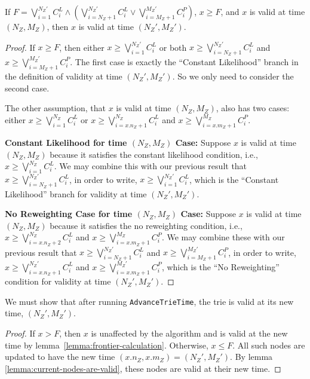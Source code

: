 \begin{lemma}
\label{lemma:frontier-calculation}
    If $F = \bigvee_{i=1}^{N_Z'} C^L_i \wedge \left(\bigvee_{i=N_Z+1}^{N_Z'} C^L_i \vee \bigvee_{i=M_Z+1}^{M_Z'} C^P_i\right)$,
    $x \geq F$,
    and $x$ is valid at time $(N_Z, M_Z)$,
    then $x$ is valid at time $(N_Z', M_Z')$.
\end{lemma}
\begin{proof}
    If $x \geq F$, then either
    $x \geq \bigvee_{i=1}^{N_Z'} C^L_i$ or both
    $x \geq \bigvee_{i=N_Z+1}^{N_Z'} C^L_i$ and
    $x \geq \bigvee_{i=M_Z+1}^{M_Z'} C^P_i$.
    The first case is exactly the ``Constant Likelihood'' branch in the definition of validity at time $(N_Z', M_Z')$.
    So we only need to consider the second case.

    The other assumption, that $x$ is valid at time $(N_Z, M_Z)$, also has two cases: either
    $x \geq \bigvee_{i=1}^{N_Z} C^L_i$ or
    $x \geq \bigvee_{i=x.n_Z+1}^{N_Z} C^L_i$ and $x \geq \bigvee_{i=x.m_Z+1}^{M_Z} C^P_i$.

    \textbf{Constant Likelihood for time $(N_Z, M_Z)$ Case:} Suppose $x$ is valid at time $(N_Z, M_Z)$ because it satisfies the constant likelihood condition, i.e., $x \geq \bigvee_{i=1}^{N_Z} C^L_i$.
    We may combine this with our previous result that
    $x \geq \bigvee_{i=N_Z+1}^{N_Z'} C^L_i$,
    in order to write,
    $x \geq \bigvee_{i=1}^{N_Z'} C^L_i$, which is the ``Constant Likelihood'' branch
    for validity at time $(N_Z', M_Z')$.

    \textbf{No Reweighting Case for time $(N_Z, M_Z)$ Case:} Suppose $x$ is valid at time $(N_Z, M_Z)$ because it satisfies the no reweighting condition, i.e., $x \geq \bigvee_{i=x.n_Z+2}^{N_Z} C^L_i$ and
    $x \geq \bigvee_{i=x.m_Z+1}^{M_Z} C^P_i$.
    We may combine these 
    with our previous result that
    $x \geq \bigvee_{i=N_Z+1}^{N_Z'} C^L_i$ and
    $x \geq \bigvee_{i=M_Z+1}^{M_Z'} C^P_i$,
    in order to write,
    $x \geq \bigvee_{i=x.n_Z+1}^{N_Z'} C^L_i$ and $x \geq \bigvee_{i=x.m_Z+1}^{M_Z'} C^P_i$,
    which is the ``No Reweighting'' condition for validity at time $(N_Z', M_Z')$.
\end{proof}

\begin{theorem}
    We must show that after running \texttt{AdvanceTrieTime},
    the trie is valid at its new time, $(N_Z', M_Z')$.
\end{theorem}
\begin{proof}
    If $x > F$, then $x$ is unaffected by the algorithm and is valid at the new time by lemma~\ref{lemma:frontier-calculation}.
    Otherwise, $x \leq F$. All such nodes
    are updated to have the new time $(x.n_Z, x.m_Z) = (N_Z', M_Z')$.
    By lemma \ref{lemma:current-nodes-are-valid}, these nodes are valid at their new time.
\end{proof}

